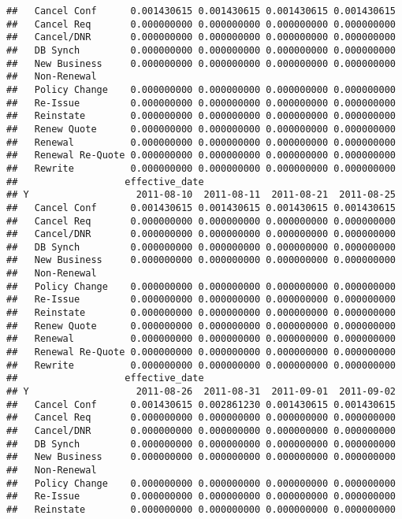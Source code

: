 \documentclass[]{article}
\begin{document}
\begin{verbatim}
##   Cancel Conf      0.001430615 0.001430615 0.001430615 0.001430615
##   Cancel Req       0.000000000 0.000000000 0.000000000 0.000000000
##   Cancel/DNR       0.000000000 0.000000000 0.000000000 0.000000000
##   DB Synch         0.000000000 0.000000000 0.000000000 0.000000000
##   New Business     0.000000000 0.000000000 0.000000000 0.000000000
##   Non-Renewal                                                     
##   Policy Change    0.000000000 0.000000000 0.000000000 0.000000000
##   Re-Issue         0.000000000 0.000000000 0.000000000 0.000000000
##   Reinstate        0.000000000 0.000000000 0.000000000 0.000000000
##   Renew Quote      0.000000000 0.000000000 0.000000000 0.000000000
##   Renewal          0.000000000 0.000000000 0.000000000 0.000000000
##   Renewal Re-Quote 0.000000000 0.000000000 0.000000000 0.000000000
##   Rewrite          0.000000000 0.000000000 0.000000000 0.000000000
##                   effective_date
## Y                   2011-08-10  2011-08-11  2011-08-21  2011-08-25
##   Cancel Conf      0.001430615 0.001430615 0.001430615 0.001430615
##   Cancel Req       0.000000000 0.000000000 0.000000000 0.000000000
##   Cancel/DNR       0.000000000 0.000000000 0.000000000 0.000000000
##   DB Synch         0.000000000 0.000000000 0.000000000 0.000000000
##   New Business     0.000000000 0.000000000 0.000000000 0.000000000
##   Non-Renewal                                                     
##   Policy Change    0.000000000 0.000000000 0.000000000 0.000000000
##   Re-Issue         0.000000000 0.000000000 0.000000000 0.000000000
##   Reinstate        0.000000000 0.000000000 0.000000000 0.000000000
##   Renew Quote      0.000000000 0.000000000 0.000000000 0.000000000
##   Renewal          0.000000000 0.000000000 0.000000000 0.000000000
##   Renewal Re-Quote 0.000000000 0.000000000 0.000000000 0.000000000
##   Rewrite          0.000000000 0.000000000 0.000000000 0.000000000
##                   effective_date
## Y                   2011-08-26  2011-08-31  2011-09-01  2011-09-02
##   Cancel Conf      0.001430615 0.002861230 0.001430615 0.001430615
##   Cancel Req       0.000000000 0.000000000 0.000000000 0.000000000
##   Cancel/DNR       0.000000000 0.000000000 0.000000000 0.000000000
##   DB Synch         0.000000000 0.000000000 0.000000000 0.000000000
##   New Business     0.000000000 0.000000000 0.000000000 0.000000000
##   Non-Renewal                                                     
##   Policy Change    0.000000000 0.000000000 0.000000000 0.000000000
##   Re-Issue         0.000000000 0.000000000 0.000000000 0.000000000
##   Reinstate        0.000000000 0.000000000 0.000000000 0.000000000

\end{verbatim}
\end{document}
